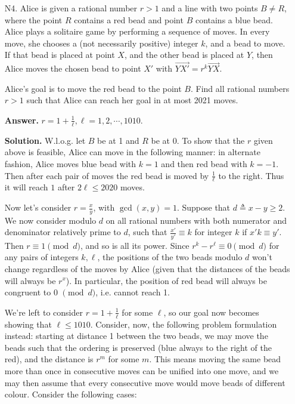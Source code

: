 \documentclass[11pt,a4paper]{article}
\begin{document}
\begin{enumerate}
\begin{proof}[Proof of Lemma \ref{lemma:n3}]
		\end{proof}
	    To finish off the problem, we have $x_i-x_{i-1}=1$ for all $i$, which then follows that $x_i=i$ and $d_i=2i-1$. 
	    This means the divisors of $n$ are all the odd numbers leading to $n$. 
	    In particular we have $n-2\mid n$ for $n>1$, which only makes sense when $n=3$. 
	    
	    \item [N4.] 
	    Alice is given a rational number $r > 1$ and a line with two points $B \neq R$, 
	    where the point $R$ contains a red bead and point $B$ contains a blue bead. 
	    Alice plays a solitaire game by performing a sequence of moves. 
	    In every move, she chooses a (not necessarily positive) integer $k$,
	    and a bead to move. 
	    If that bead is placed at point $X$, and the other bead is placed at $Y$, 
	    then Alice moves the chosen bead to point $X'$ with $\vec{YX'} = r^k\vec{YX}$. 
	    
	    Alice’s goal is to move the red bead to the point $B$. 
	    Find all rational numbers $r > 1$ such that Alice can reach her goal in at most 2021 moves.
	    
	    \textbf{Answer.} $r = 1+\frac 1{\ell}, \ell=1, 2, \cdots, 1010$. 
	    
	    \textbf{Solution.} 
	    W.l.o.g. let $B$ be at 1 and $R$ be at 0. 
	    To show that the $r$ given above is feasible, 
	    Alice can move in the following manner: 
	    in alternate fashion, Alice moves blue bead with $k=1$ and then red bead with $k=-1$. 
	    Then after each pair of moves the red bead is moved by $\frac{1}{\ell}$ to the right. 
	    Thus it will reach $1$ after $2\ell\le 2020$ moves. 
	    
	    Now let's consider $r=\frac{x}{y}$, with $\gcd(x, y)=1$. 
	    Suppose that $d\triangleq x - y\ge 2$. 
	    We now consider modulo $d$ on all rational numbers with both numerator and denominator relatively prime to $d$, 
	    such that $\frac{x'}{y'}\equiv k$ for integer $k$ if $x'k\equiv y'$. 
	    Then $r\equiv 1\pmod{d}$, and so is all its power. 
	    Since $r^k-r^{\ell}\equiv 0\pmod{d}$ for any pairs of integers $k, \ell$, 
	    the positions of the two beads modulo $d$ won't change regardless of the moves by Alice (given that the distances of the beads will always be $r^{x}$). 
	    In particular, the position of red bead will always be congruent to 0 $\pmod{d}$, 
	    i.e. cannot reach 1. 
	    
	    We're left to consider $r = 1 + \frac 1{\ell}$ for some $\ell$, so our goal now becomes showing that $\ell\le 1010$. 
	    Consider, now, the following problem formulation instead:
	    starting at distance 1 between the two beads, we may move the beads such that the ordering is preserved (blue always to the right of the red), and the distance is $r^{m}$ for some $m$. 
	    This means moving the same bead more than once in consecutive moves can be unified into one move, 
	    and we may then assume that every consecutive move would move beads of different colour. 
	    Consider the following cases: 
	    

\end{enumerate}
\end{document}

